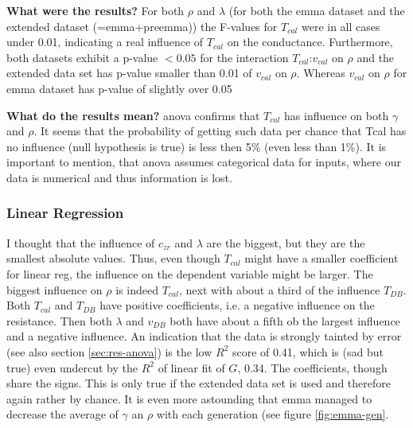 \textbf{What were the results?}
For both $\rho$ and $\lambda$ (for both the \gls{emma} dataset and the extended dataset (=\gls{emma}+pre\gls{emma})) 
the F-values for $T_{cal}$ were in all cases under 0.01, 
indicating a real influence of $T_{cal}$ on the conductance.
Furthermore, both datasets exhibit a p-value $< 0.05$ for the interaction $T_{cal}$:$v_{cal}$ on $\rho$
and the extended data set has p-value smaller than 0.01 of $v_{cal}$ on $\rho$. 
Whereas $v_{cal}$ on $\rho$ for \gls{emma} dataset has p-value of slightly over 0.05

\textbf{What do the results mean?} 
\Gls{anova} confirms that $T_{cal}$ has influence on both $\gamma$ and $\rho$. 
It seems that the probability of getting such data per chance that Tcal has no influence 
(null hypothesis is true) is less then 5\% (even less than 1\%). 
It is important to mention, that \gls{anova} assumes categorical data for inputs, 
where our data is numerical and thus information is lost. 


\subsubsection{Linear Regression}
I thought that the influence of $c_{zr}$ and $\lambda$ are the biggest, but they are the smallest absolute values. 
Thus, even though $T_{cal}$ might have a smaller coefficient for linear reg, the influence on the dependent variable might be larger. 
The biggest influence on $\rho$ is indeed $T_{cal}$, next with about a third of the influence $T_{DB}$. 
Both $T_{cal}$ and $T_{DB}$ have positive coefficients, i.e. a negative influence on the resistance. 
Then both $\lambda$ and $v_{DB}$ both have about a fifth ob the largest influence and a negative influence. 
An indication that the data is strongly tainted by error (see also section \ref{sec:res-anova}) is the low $R^2$ score of 0.41, 
which is (sad but true) even undercut by the $R^2$ of linear fit of $G$, 0.34. 
The coefficients, though share the signs. 
This is only true if the extended data set is used and therefore again rather by chance. 
It is even more astounding that \gls{emma} managed to decrease the average of $\gamma$ an $\rho$ with each generation (see figure \ref{fig:emma-gen}. 

